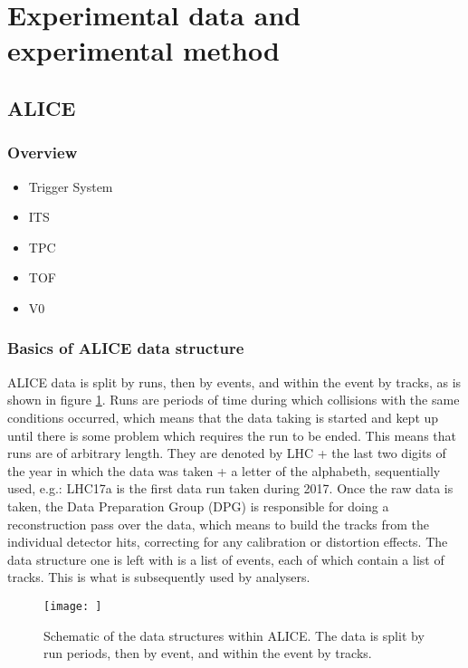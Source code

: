 \section{Experimental data and experimental method}

\subsection{ALICE}
\subsubsection{Overview}
\begin{itemize}
    \item Trigger System
    \item ITS
    \item TPC
    \item TOF
	\item V0
\end{itemize}

\subsubsection{Basics of ALICE data structure}
ALICE data is split by runs, then by events, and within the event by tracks, as is shown in figure \ref{fig:ALICE_data_schematic}. Runs are periods of time during which collisions with the same conditions occurred, which means that the data taking is started and kept up until there is some problem which requires the run to be ended. This means that runs are of arbitrary length. They are denoted by LHC + the last two digits of the year in which the data was taken + a letter of the alphabeth, sequentially used, e.g.: LHC17a is the first data run taken during 2017. Once the raw data is taken, the Data Preparation Group (DPG) is responsible for doing a reconstruction pass over the data, which means to build the tracks from the individual detector hits, correcting for any calibration or distortion effects. The data structure  one is left with is a list of events, each of which contain a list of tracks. This is what is subsequently used by analysers. 

\begin{figure}
	\texttt{[image: ]}
	\centering
	\caption{Schematic of the data structures within ALICE. The data is split by run periods, then by event, and within the event by tracks. }
		\label{fig:ALICE_data_schematic}
\end{figure}
